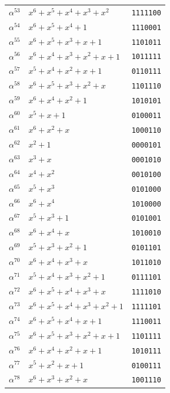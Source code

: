 \documentclass[10pt,a4paper]{article}
\begin{document}
\begin{longtable}{@{}c l c@{}}
    $\alpha^{53}$ & $x^{6}+x^{5}+x^{4}+x^{3}+x^{2}$ & \texttt{1111100} \\
    $\alpha^{54}$ & $x^{6}+x^{5}+x^{4}+1$ & \texttt{1110001} \\
    $\alpha^{55}$ & $x^{6}+x^{5}+x^{3}+x+1$ & \texttt{1101011} \\
    $\alpha^{56}$ & $x^{6}+x^{4}+x^{3}+x^{2}+x+1$ & \texttt{1011111} \\
    $\alpha^{57}$ & $x^{5}+x^{4}+x^{2}+x+1$ & \texttt{0110111} \\
    $\alpha^{58}$ & $x^{6}+x^{5}+x^{3}+x^{2}+x$ & \texttt{1101110} \\
    $\alpha^{59}$ & $x^{6}+x^{4}+x^{2}+1$ & \texttt{1010101} \\
    $\alpha^{60}$ & $x^{5}+x+1$ & \texttt{0100011} \\
    $\alpha^{61}$ & $x^{6}+x^{2}+x$ & \texttt{1000110} \\
    $\alpha^{62}$ & $x^{2}+1$ & \texttt{0000101} \\
    $\alpha^{63}$ & $x^{3}+x$ & \texttt{0001010} \\
    $\alpha^{64}$ & $x^{4}+x^{2}$ & \texttt{0010100} \\
    $\alpha^{65}$ & $x^{5}+x^{3}$ & \texttt{0101000} \\
    $\alpha^{66}$ & $x^{6}+x^{4}$ & \texttt{1010000} \\
    $\alpha^{67}$ & $x^{5}+x^{3}+1$ & \texttt{0101001} \\
    $\alpha^{68}$ & $x^{6}+x^{4}+x$ & \texttt{1010010} \\
    $\alpha^{69}$ & $x^{5}+x^{3}+x^{2}+1$ & \texttt{0101101} \\
    $\alpha^{70}$ & $x^{6}+x^{4}+x^{3}+x$ & \texttt{1011010} \\
    $\alpha^{71}$ & $x^{5}+x^{4}+x^{3}+x^{2}+1$ & \texttt{0111101} \\
    $\alpha^{72}$ & $x^{6}+x^{5}+x^{4}+x^{3}+x$ & \texttt{1111010} \\
    $\alpha^{73}$ & $x^{6}+x^{5}+x^{4}+x^{3}+x^{2}+1$ & \texttt{1111101} \\
    $\alpha^{74}$ & $x^{6}+x^{5}+x^{4}+x+1$ & \texttt{1110011} \\
    $\alpha^{75}$ & $x^{6}+x^{5}+x^{3}+x^{2}+x+1$ & \texttt{1101111} \\
    $\alpha^{76}$ & $x^{6}+x^{4}+x^{2}+x+1$ & \texttt{1010111} \\
    $\alpha^{77}$ & $x^{5}+x^{2}+x+1$ & \texttt{0100111} \\
    $\alpha^{78}$ & $x^{6}+x^{3}+x^{2}+x$ & \texttt{1001110} \\

\end{longtable}
\end{document}
